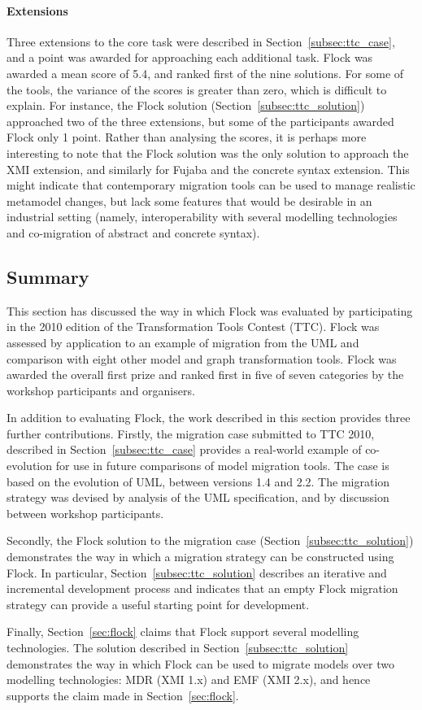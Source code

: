 \paragraph{Extensions} Three extensions to the core task were described in Section~\ref{subsec:ttc_case}, and a point was awarded for approaching each additional task. Flock was awarded a mean score of 5.4, and ranked first of the nine solutions. For some of the tools, the variance of the scores is greater than zero, which is difficult to explain. For instance, the Flock solution (Section~\ref{subsec:ttc_solution}) approached two of the three extensions, but some of the participants awarded Flock only 1 point. Rather than analysing the scores, it is perhaps more interesting to note that the Flock solution was the only solution to approach the XMI extension, and similarly for Fujaba \cite{fujaba} and the concrete syntax extension. This might indicate that contemporary migration tools can be used to manage realistic metamodel changes, but lack some features that would be desirable in an industrial setting (namely, interoperability with several modelling technologies and co-migration of abstract and concrete syntax).

\subsection{Summary}
This section has discussed the way in which Flock was evaluated by participating in the 2010 edition of the Transformation Tools Contest (TTC). Flock was assessed by application to an example of migration from the UML and comparison with eight other model and graph transformation tools. Flock was awarded the overall first prize and ranked first in five of seven categories by the workshop participants and organisers. 

In addition to evaluating Flock, the work described in this section provides three further contributions. Firstly, the migration case submitted to TTC 2010, described in Section~\ref{subsec:ttc_case} provides a real-world example of co-evolution for use in future comparisons of model migration tools. The case is based on the evolution of UML, between versions 1.4 and 2.2. The migration strategy was devised by analysis of the UML specification, and by discussion between workshop participants.


Secondly, the Flock solution to the migration case (Section~\ref{subsec:ttc_solution}) demonstrates the way in which a migration strategy can be constructed using Flock. In particular, Section~\ref{subsec:ttc_solution} describes an iterative and incremental development process and indicates that an empty Flock migration strategy can provide a useful starting point for development.

Finally, Section~\ref{sec:flock} claims that Flock support several modelling technologies. The solution described in Section~\ref{subsec:ttc_solution} demonstrates the way in which Flock can be used to migrate models over two modelling technologies: MDR (XMI 1.x) and EMF (XMI 2.x), and hence supports the claim made in Section~\ref{sec:flock}.